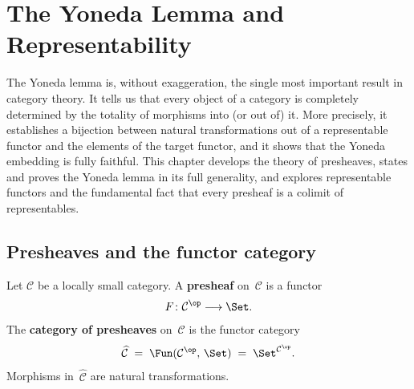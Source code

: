 

\chapter{The Yoneda Lemma and Representability}\label{ch:yoneda}
\minitoc

\vspace{1em}

The Yoneda lemma is, without exaggeration, the single most important
result in category theory.  It tells us that every object of a category
is completely determined by the totality of morphisms into (or out of) it.
More precisely, it establishes a bijection between natural
transformations out of a representable functor and the elements of the
target functor, and it shows that the Yoneda embedding is fully faithful.
This chapter develops the theory of presheaves, states and proves the
Yoneda lemma in its full generality, and explores representable functors
and the fundamental fact that every presheaf is a colimit of
representables.


\section{Presheaves and the functor category}\label{sec:presheaves}

\begin{definition}[Presheaf]\label{def:presheaf}
Let $\mathcal{C}$ be a locally small category.
A \textbf{presheaf} on~$\mathcal{C}$ is a functor
\[
    F \colon \mathcal{C}^{\op} \longrightarrow \Set.
\]
The \textbf{category of presheaves} on~$\mathcal{C}$ is the functor category
\[
    \widehat{\mathcal{C}} \;=\; \Fun(\mathcal{C}^{\op},\,\Set)
    \;=\; \Set^{\mathcal{C}^{\op}}.
\]
Morphisms in~$\widehat{\mathcal{C}}$ are natural transformations.
\end{definition}

